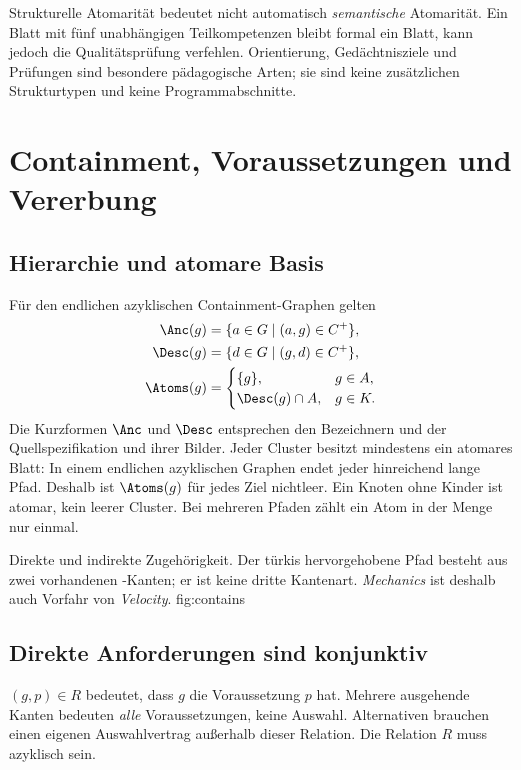 Strukturelle Atomarität bedeutet nicht automatisch \emph{semantische}
Atomarität. Ein Blatt mit fünf unabhängigen Teilkompetenzen bleibt formal
ein Blatt, kann jedoch die Qualitätsprüfung verfehlen. Orientierung,
Gedächtnisziele und Prüfungen sind besondere pädagogische Arten; sie sind
keine zusätzlichen Strukturtypen und keine Programmabschnitte.

\section{Containment, Voraussetzungen und Vererbung}
\subsection{Hierarchie und atomare Basis}
Für den endlichen azyklischen Containment-Graphen gelten
\begin{align}
 \Anc(g)&=\{a\in G\mid(a,g)\in C^+\},\\
 \Desc(g)&=\{d\in G\mid(g,d)\in C^+\},\\
 \Atoms(g)&=\begin{cases}\{g\},&g\in A,\\\Desc(g)\cap A,&g\in K.\end{cases}
\end{align}
Die Kurzformen $\Anc$ und $\Desc$ entsprechen den Bezeichnern
 und  der Quellspezifikation und ihrer Bilder.
Jeder Cluster besitzt mindestens ein atomares Blatt: In einem endlichen
azyklischen Graphen endet jeder hinreichend lange Pfad. Deshalb ist
$\Atoms(g)$ für jedes Ziel nichtleer. Ein Knoten ohne Kinder ist atomar,
kein leerer Cluster. Bei mehreren Pfaden zählt ein Atom in der Menge nur einmal.

{Direkte und indirekte Zugehörigkeit. Der türkis hervorgehobene Pfad besteht
aus zwei vorhandenen -Kanten; er ist keine dritte Kantenart.
\emph{Mechanics} ist deshalb auch Vorfahr von \emph{Velocity}.}
{fig:contains}
\FloatBarrier

\subsection{Direkte Anforderungen sind konjunktiv}
$(g,p)\in R$ bedeutet, dass $g$ die Voraussetzung $p$ hat. Mehrere
ausgehende Kanten bedeuten \emph{alle} Voraussetzungen, keine Auswahl.
Alternativen brauchen einen eigenen Auswahlvertrag außerhalb dieser Relation.
Die Relation $R$ muss azyklisch sein.

